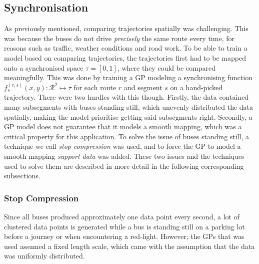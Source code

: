 \subsection{Synchronisation}
As previously mentioned, comparing trajectories spatially was challenging. This was because the buses do not drive \textit{precisely} the same route every time, for reasons such as traffic, weather conditions and road work. To be able to train a model based on comparing trajectories, the trajectories first had to be mapped onto a synchronised space $\tau = [0, 1]$, where they could be compared meaningfully. This was done by training a GP modeling a synchronising function $f^{(r,s)}_s(x, y) : \mathcal{R}^2 \mapsto \tau$ for each route $r$ and segment $s$ on a hand-picked trajectory. There were two hurdles with this though. Firstly, the data contained many subsegments with buses standing still, which unevenly distributed the data spatially, making the model prioritise getting said subsegments right. Secondly, a GP model does not guarantee that it models a smooth mapping, which was a critical property for this application. To solve the issue of buses standing still, a technique we call \textit{stop compression} was used, and to force the GP to model a smooth mapping \textit{support data} was added. These two issues and the techniques used to solve them are described in more detail in the following corresponding subsections.

\subsubsection{Stop Compression}
\label{sec:stop-compression}
Since all buses produced approximately one data point every second, a lot of clustered data points is generated while a bus is standing still on a parking lot before a journey or when encountering a red-light. However; the GPs that was used assumed a fixed length scale, which came with the assumption that the data was uniformly distributed.

